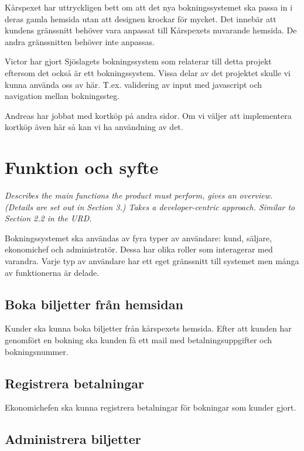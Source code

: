 \documentclass[a4paper, twoside, 11pt, titlepage]{article}
\begin{document}
Kårspexet har uttryckligen bett om att det nya bokningssystemet ska passa in i deras gamla hemsida utan att designen krockar för mycket. Det innebär att kundens gränssnitt behöver vara anpassat till Kårspexets nuvarande hemsida. De andra gränssnitten behöver inte anpassas.

Victor har gjort Sjöslagets bokningssystem som relaterar till detta projekt eftersom det också är ett bokningssystem. Vissa delar av det projektet skulle vi kunna använda oss av här. T.ex. validering av input med javascript och navigation mellan bokningssteg.

Andreas har jobbat med kortköp på andra sidor. Om vi väljer att implementera kortköp även här så kan vi ha användning av det.

\clearpage
\section{Funktion och syfte}


\emph{Describes the main functions the product must perform, gives an overview. (Details are set out in Section 3.) Takes a developer-centric approach. Similar to Section 2.2 in the URD.}

Bokningssystemet ska användas av fyra typer av användare: kund, säljare, ekonomichef och administratör. Dessa har olika roller som interagerar med varandra. Varje typ av användare har ett eget gränssnitt till systemet men många av funktionerna är delade.

	\subsection{Boka biljetter från hemsidan}


	Kunder ska kunna boka biljetter från kårspexets hemsida. Efter att kunden har genomfört en bokning ska kunden få ett mail med betalningsuppgifter och bokningsnummer.

	\subsection{Registrera betalningar}


	Ekonomichefen ska kunna registrera betalningar för bokningar som kunder gjort.

	\subsection{Administrera biljetter}
\end{document}

